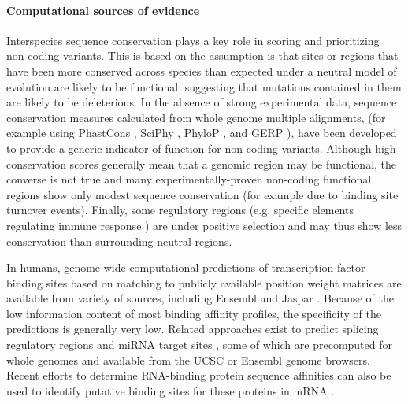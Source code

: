\paragraph{Computational sources of evidence} 
Interspecies sequence conservation plays a key role in scoring and prioritizing non-coding variants. 
This is based on the assumption is that sites or regions that have been more conserved across species than expected under a neutral model of evolution are likely to be functional; suggesting that mutations contained in them are likely to be deleterious. 
In the absence of strong experimental data, sequence conservation measures calculated from whole genome multiple alignments, (for example using PhastCons \cite{siepel2005evolutionarily}, SciPhy \cite{garber2009identifying}, PhyloP \cite{pollard2010detection}, and GERP  \cite{davydov2010identifying}), have been developed to provide a generic indicator of function for non-coding variants. 
Although high conservation scores generally mean that a genomic region may be functional, the converse is not true and many experimentally-proven non-coding functional regions show only modest sequence conservation (for example due to binding site turnover events). 
Finally, some regulatory regions (e.g. specific elements regulating immune response  \cite{raj2013common}) are under positive selection and may thus show less conservation than surrounding neutral regions. 

In humans, genome-wide computational predictions of transcription factor binding sites based on matching to publicly available position weight matrices are available from variety of sources, including Ensembl \cite{flicek2012ensembl} and Jaspar  \cite{bryne2008jaspar}.  Because of the low information content of most binding affinity profiles, the specificity of the predictions is generally very low. Related approaches exist to predict splicing regulatory regions  \cite{fairbrother2002predictive} and miRNA target sites \cite{ziebarth2011polymirts}, some of which are precomputed for whole genomes and available from the UCSC or Ensembl genome browsers. Recent efforts to determine RNA-binding protein sequence affinities can also be used to identify putative binding sites for these proteins in mRNA  \cite{ray2013compendium}.

